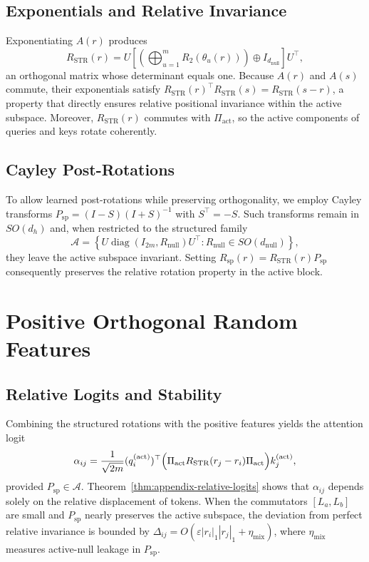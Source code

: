 \documentclass[11pt]{article}
\begin{document}
\subsection{Exponentials and Relative Invariance}

Exponentiating $A(r)$ produces
\[
R_{\mathrm{STR}}(r) = U \left[\left(\bigoplus_{u=1}^m R_2(\theta_u(r))\right) \oplus I_{d_{\mathrm{null}}}\right] U^\top,
\]
an orthogonal matrix whose determinant equals one. Because $A(r)$ and $A(s)$ commute, their
exponentials satisfy $R_{\mathrm{STR}}(r)^\top R_{\mathrm{STR}}(s) = R_{\mathrm{STR}}(s-r)$, a property
that directly ensures relative positional invariance within the active subspace. Moreover,
$R_{\mathrm{STR}}(r)$ commutes with $\Pi_{\mathrm{act}}$, so the active components of queries and keys
rotate coherently.

\subsection{Cayley Post-Rotations}

To allow learned post-rotations while preserving orthogonality, we employ Cayley transforms
$P_{\mathrm{sp}} = (I-S)(I+S)^{-1}$ with $S^\top = -S$. Such transforms remain in $SO(d_h)$ and,
when restricted to the structured family
\[
\mathcal{A} = \left\{U \operatorname{diag}(I_{2m}, R_{\mathrm{null}}) U^\top: R_{\mathrm{null}}\in SO(d_{\mathrm{null}})\right\},
\]
they leave the active subspace invariant. Setting $R_{\mathrm{sp}}(r) = R_{\mathrm{STR}}(r) P_{\mathrm{sp}}$
consequently preserves the relative rotation property in the active block.

\section{Positive Orthogonal Random Features}
\label{sec:favor-structured}

\subsection{Relative Logits and Stability}

Combining the structured rotations with the positive features yields the attention logit
\[
\alpha_{ij}
= \frac{1}{\sqrt{2m}} (q_i^{(\mathrm{act})})^\top
  \Bigl(\Pi_{\mathrm{act}} R_{\mathrm{STR}}(r_j - r_i) \Pi_{\mathrm{act}}\Bigr)
  k_j^{(\mathrm{act})},
\]
provided $P_{\mathrm{sp}}\in\mathcal{A}$. Theorem~\ref{thm:appendix-relative-logits} shows that $\alpha_{ij}$ depends solely on the
relative displacement of tokens. When the commutators $[L_a,L_b]$ are small and
$P_{\mathrm{sp}}$ nearly preserves the active subspace, the deviation from perfect relative invariance is
bounded by $\Delta_{ij} = O(\varepsilon |r_i|_1 |r_j|_1 + \eta_{\mathrm{mix}})$, where $\eta_{\mathrm{mix}}$ measures
active-null leakage in $P_{\mathrm{sp}}$.
\end{document}
